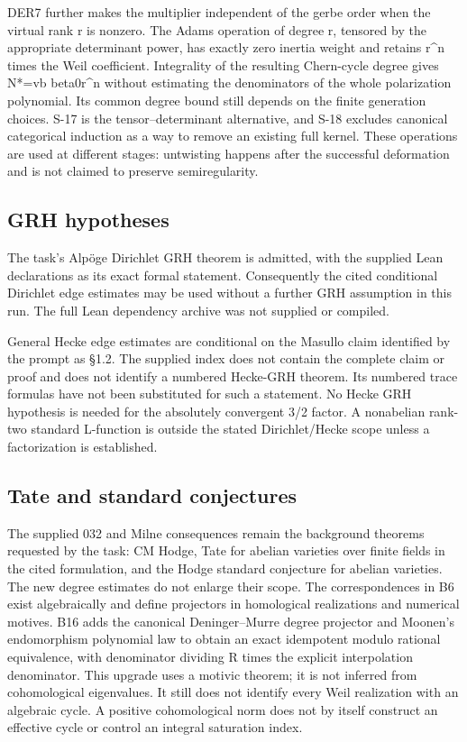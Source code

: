 \documentclass[11pt,a4paper]{article}
\theoremstyle{definition}
\begin{document}
DER7 further makes the multiplier independent of the gerbe order when
the virtual rank r is nonzero. The Adams operation of degree
\textbar r\textbar, tensored by the appropriate determinant power, has
exactly zero inertia weight and retains \textbar r\textbar\^{}n times
the Weil coefficient. Integrality of the resulting Chern-cycle degree
gives N*=v\textbar b beta0\textbar\textbar r\textbar\^{}n without
estimating the denominators of the whole polarization polynomial. Its
common degree bound still depends on the finite generation choices. S-17
is the tensor--determinant alternative, and S-18 excludes canonical
categorical induction as a way to remove an existing full kernel. These
operations are used at different stages: untwisting happens after the
successful deformation and is not claimed to preserve semiregularity.

\subsection{GRH hypotheses}\label{grh-hypotheses}

The task's Alpöge Dirichlet GRH theorem is admitted, with the supplied
Lean declarations as its exact formal statement. Consequently the cited
conditional Dirichlet edge estimates may be used without a further GRH
assumption in this run. The full Lean dependency archive was not
supplied or compiled.

General Hecke edge estimates are conditional on the Masullo claim
identified by the prompt as §1.2. The supplied index does not contain
the complete claim or proof and does not identify a numbered Hecke-GRH
theorem. Its numbered trace formulas have not been substituted for such
a statement. No Hecke GRH hypothesis is needed for the absolutely
convergent 3/2 factor. A nonabelian rank-two standard L-function is
outside the stated Dirichlet/Hecke scope unless a factorization is
established.

\subsection{Tate and standard
conjectures}\label{tate-and-standard-conjectures}

The supplied 032 and Milne consequences remain the background theorems
requested by the task: CM Hodge, Tate for abelian varieties over finite
fields in the cited formulation, and the Hodge standard conjecture for
abelian varieties. The new degree estimates do not enlarge their scope.
The correspondences in B6 exist algebraically and define projectors in
homological realizations and numerical motives. B16 adds the canonical
Deninger--Murre degree projector and Moonen's endomorphism polynomial
law to obtain an exact idempotent modulo rational equivalence, with
denominator dividing R times the explicit interpolation denominator.
This upgrade uses a motivic theorem; it is not inferred from
cohomological eigenvalues. It still does not identify every Weil
realization with an algebraic cycle. A positive cohomological norm does
not by itself construct an effective cycle or control an integral
saturation index.
\end{document}
